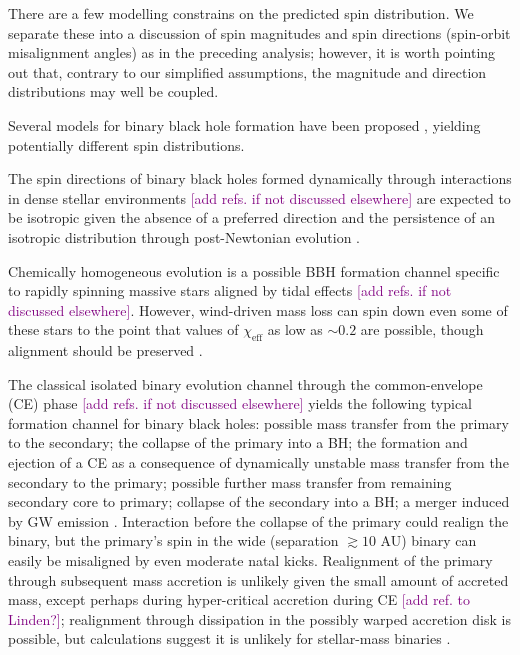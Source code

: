 \documentclass[modern,linenumbers]{aastex61}
\newcommand{\ilya}[1]{\textcolor{purple}{#1}}
\begin{document}
There are a few modelling constrains on the predicted spin
distribution.  We separate these into a discussion of spin magnitudes
and spin directions (spin-orbit misalignment angles) as in the
preceding analysis; however, it is worth pointing out that, contrary
to our simplified assumptions, the magnitude and direction
distributions may well be coupled.

Several models for binary black hole formation have been proposed
\citep[e.g.,][]{2016ApJ...818L..22A}, yielding potentially different spin
distributions.

The spin directions of binary black holes formed dynamically through
interactions in dense stellar environments \ilya{[add refs. if not
  discussed elsewhere]} are expected to be isotropic given the absence
of a preferred direction \citep[e.g.,][]{2016ApJ...832L...2R} and the
persistence of an isotropic distribution through post-Newtonian
evolution \citep{2004PhRvD..70l4020S}.

Chemically homogeneous evolution is a possible BBH formation channel
specific to rapidly spinning massive stars aligned by tidal effects
\ilya{[add refs. if not discussed elsewhere]}.  However, wind-driven
mass loss can spin down even some of these stars to the point that
values of $\chi_\textrm{eff}$ as low as $\sim 0.2$ are possible,
though alignment should be preserved \citep{2016AnA...588A..50M}.

The classical isolated binary evolution channel through the
common-envelope (CE) phase \ilya{[add refs. if not discussed
  elsewhere]} yields the following typical formation channel for
binary black holes: possible mass transfer from the primary to the
secondary; the collapse of the primary into a BH; the formation and
ejection of a CE as a consequence of dynamically unstable mass
transfer from the secondary to the primary; possible further mass
transfer from remaining secondary core to primary; collapse of the
secondary into a BH; a merger induced by GW emission
\citep[e.g.,][]{2016Natur.534..512B,Stevenson:2017}.  Interaction
before the collapse of the primary could realign the binary, but the
primary’s spin in the wide (separation $\gtrsim 10$ AU) binary can
easily be misaligned by even moderate \citep{2015MNRAS.450L..85M}
natal kicks.  Realignment of the primary through subsequent mass
accretion is unlikely given the small amount of accreted mass, except
perhaps during hyper-critical accretion during CE \ilya{[add ref. to
  Linden?]}; realignment through dissipation in the possibly warped
accretion disk \citep{1975ApJ...195L..65B} is possible, but calculations
suggest it is unlikely for stellar-mass binaries \citep{KLOP}.
\end{document}
